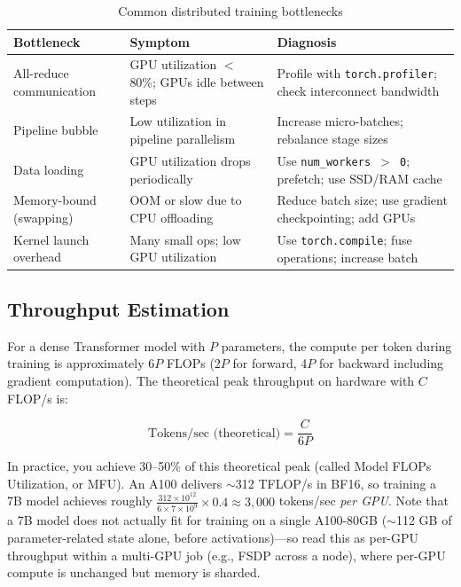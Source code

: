 \begin{table}[H]
\centering
\caption{Common distributed training bottlenecks}
\begin{tabularx}{\textwidth}{lXX}
\toprule
\textbf{Bottleneck} & \textbf{Symptom} & \textbf{Diagnosis} \\
\midrule
All-reduce communication & GPU utilization $<$ 80\%; GPUs idle between steps & Profile with \texttt{torch.profiler}; check interconnect bandwidth \\
Pipeline bubble & Low utilization in pipeline parallelism & Increase micro-batches; rebalance stage sizes \\
Data loading & GPU utilization drops periodically & Use \texttt{num\_workers $>$ 0}; prefetch; use SSD/RAM cache \\
Memory-bound (swapping) & OOM or slow due to CPU offloading & Reduce batch size; use gradient checkpointing; add GPUs \\
Kernel launch overhead & Many small ops; low GPU utilization & Use \texttt{torch.compile}; fuse operations; increase batch \\
\bottomrule
\end{tabularx}
\end{table}

\subsection{Throughput Estimation}

For a dense Transformer model with $P$ parameters, the compute per token during training is approximately $6P$ FLOPs (2$P$ for forward, 4$P$ for backward including gradient computation). The theoretical peak throughput on hardware with $C$ FLOP/s is:

\begin{equation}
\text{Tokens/sec (theoretical)} = \frac{C}{6P}
\end{equation}

In practice, you achieve 30--50\% of this theoretical peak (called Model FLOPs Utilization, or MFU). An A100 delivers $\sim$312 TFLOP/s in BF16, so training a 7B model achieves roughly $\frac{312 \times 10^{12}}{6 \times 7 \times 10^9} \times 0.4 \approx 3{,}000$ tokens/sec \textit{per GPU}. Note that a 7B model does not actually fit for training on a single A100-80GB ($\sim$112 GB of parameter-related state alone, before activations)---so read this as per-GPU throughput within a multi-GPU job (e.g., FSDP across a node), where per-GPU compute is unchanged but memory is sharded.

